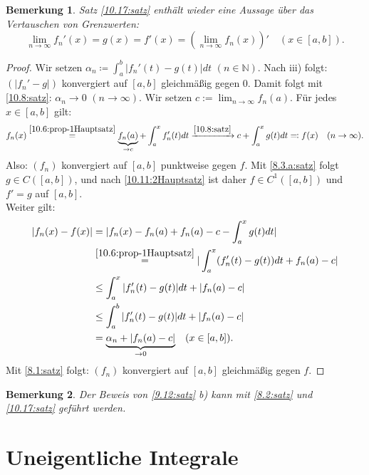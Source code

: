 \documentclass[12pt]{extreport} %
\newcommand{\N}{\mathbb{N}}
\theoremstyle{named}
\theoremstyle{itshape}
\theoremstyle{normal}
\newtheorem*{bemerkung}{Bemerkung}
\begin{document}
{\begin{bemerkung}
Satz \ref{10.17:satz} enthält wieder eine Aussage über das Vertauschen von Grenzwerten:
$$\lim_{n \rightarrow \infty} f_{n}'(x) = g(x) = f'(x) = (\lim_{n \rightarrow \infty} f_{n}(x))' \quad (x \in [a,b]).$$ 
\end{bemerkung}

\begin{proof}
	Wir setzen $\alpha_{n} \coloneqq \int_{a}^{b} |f_{n}'(t)- g(t)| dt$ $(n \in \N)$. Nach iii) folgt: $(|f_{n}' - g|)$ konvergiert auf $[a, b]$ gleichmä{\ss}ig gegen 
	$0$. Damit folgt mit \ref{10.8:satz}: $\alpha_{n} \rightarrow 0$ $(n \to \infty)$. Wir setzen $c:= \lim_{n \to \infty} f_{n}(a)$. Für jedes $x \in [a, b]$ gilt:
	$$ 
	f_{n}(x) \overset{\ref{10.6:prop-1Hauptsatz}}{=} \underbrace{f_{n}(a)}_{\rightarrow c} + \int_{a}^{x} f_{n}'(t) dt 
	\xrightarrow[]{\ref{10.8:satz}} c + \int_{a}^{x} g(t) dt \eqqcolon f(x) \quad (n \to \infty). 
	$$
	Also: $(f_{n})$ konvergiert auf $[a, b]$ punktweise gegen $f$. Mit \ref{8.3.a:satz} folgt $g \in C([a, b])$, und nach \ref{10.11:2Hauptsatz} ist daher
	$f \in C^{1}([a, b])$ und $f' = g$ auf $[a,b]$. \\
	Weiter gilt:
	\begin{align*}
		|f_{n}(x) - f(x)| & = |f_{n}(x) - f_{n}(a) + f_{n}(a) - c - \int_{a}^{x} g(t) dt  | \\
		& \overset{\ref{10.6:prop-1Hauptsatz}}{=} |\int_{a}^{x} (f_{n}'(t) - g(t)) dt + f_{n}(a) - c | \\
		& \leq \int_{a}^{x} |f_{n}'(t) - g(t)| dt + |f_{n}(a)-c| \\
		& \leq \int_{a}^{b} |f'_{n}(t) - g(t)| dt + |f_{n}(a)-c| \\
		& = \underbrace{\alpha_{n} + |f_{n}(a)-c|}_{\rightarrow 0} \quad (x \in [a, b]).
	\end{align*}
	Mit \ref{8.1:satz} folgt: $(f_{n})$ konvergiert auf $[a, b]$ gleichmä{\ss}ig gegen $f$.
\end{proof}


\begin{bemerkung}
	Der Beweis von \ref{9.12:satz} b) kann mit \ref{8.2:satz} und \ref{10.17:satz} geführt werden.	
\end{bemerkung}


\newpage


\chapter{Uneigentliche Integrale}


}
\end{document}
